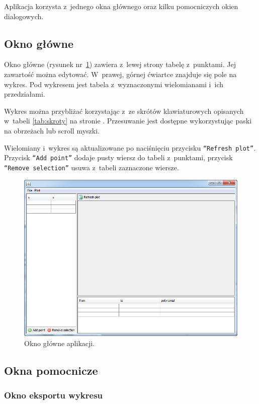 \documentclass[10pt,a4paper]{article}
\newcommand{\prog}[1]{\texttt{#1}}
\begin{document}
Aplikacja korzysta z~jednego okna głównego oraz kilku pomocniczych okien
dialogowych.

\subsection{Okno główne}

Okno główne (rysunek nr~\ref{fig:okno-glowne}) zawiera z~lewej strony
tabelę z~punktami. Jej zawartość można edytować. W~prawej, górnej ćwiartce
znajduje się pole na wykres. Pod wykresem jest tabela z~wyznaczonymi
wielomianami i~ich przedziałami.

Wykres można przybliżać korzystając z~ze skrótów klawiaturowych opisanych
w~tabeli \ref{tab:skroty} na stronie \pageref{tab:skroty}. Przesuwanie jest
dostępne wykorzystując paski na obrzeżach lub scroll myszki.

Wielomiany i~wykres są aktualizowane po naciśnięciu przycisku \prog{``Refresh
plot''}. Przycisk \prog{``Add point''} dodaje pusty wiersz do tabeli
z~punktami, przycisk \prog{``Remove selection''} usuwa z~tabeli zaznaczone
wiersze.

\begin{figure}[hb]
  \centering
  \includegraphics[width=\textwidth]{images/okno-glowne}
  \caption{Okno główne aplikacji.}
  \label{fig:okno-glowne}
\end{figure}

\subsection{Okna pomocnicze}

\subsubsection{Okno eksportu wykresu}
\end{document}
